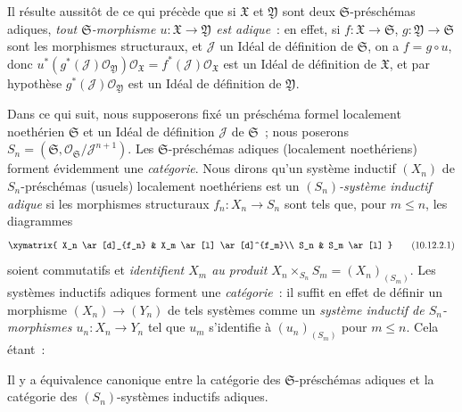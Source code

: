 Il résulte aussitôt de ce qui précède que si $\mathfrak{X}$ et
$\mathfrak{Y}$ sont deux $\mathfrak{S}$-préschémas adiques, \emph{tout
$\mathfrak{S}$-morphisme $u:\mathfrak{X}\to\mathfrak{Y}$ est adique}~:
en effet, si $f:\mathfrak{X}\to\mathfrak{S}$,
$g:\mathfrak{Y}\to\mathfrak{S}$ sont les morphismes structuraux, et
$\mathscr{J}$ un Idéal de définition de $\mathfrak{S}$, on a
$f=g\circ u$, donc
$u^*(g^*(\mathscr{J})\mathscr{O}_{\mathfrak{Y}})
\mathscr{O}_{\mathfrak{X}}=f^*(\mathscr{J})
\mathscr{O}_{\mathfrak{X}}$ est un Idéal de définition de
$\mathfrak{X}$, et par hypothèse
$g^*(\mathscr{J})\mathscr{O}_{\mathfrak{Y}}$ est un Idéal de définition
de $\mathfrak{Y}$.

\begin{env}[10.12.2]
\label{I.10.12.2-fr}
Dans ce qui suit, nous supposerons fixé un préschéma formel localement
noethérien $\mathfrak{S}$ et un Idéal de définition $\mathscr{J}$ de
$\mathfrak{S}$~; nous poserons
$S_n=(\mathfrak{S},\mathscr{O}_{\mathfrak{S}}/\mathscr{J}^{n+1})$. Les
$\mathfrak{S}$-préschémas adiques (localement noethériens) forment
évidemment une \emph{catégorie}. Nous dirons qu'un système inductif
$(X_n)$ de $S_n$-préschémas (usuels) localement noethériens est un
\emph{$(S_n)$-système inductif adique} si les morphismes structuraux
$f_n:X_n\to S_n$ sont tels que, pour $m\leq n$, les diagrammes
\[
  \label{I.10.12.2.1-fr}
  \xymatrix{
    X_n \ar[d]_{f_n}
    & X_m \ar[l] \ar[d]^{f_m}\\
    S_n
    & S_m \ar[l]
  }
  \tag{10.12.2.1}
\]
soient commutatifs et \emph{identifient $X_m$ au produit
$X_n\times_{S_n}S_m=(X_n)_{(S_m)}$}. Les systèmes inductifs adiques
forment une \emph{catégorie}~: il suffit en effet de définir un morphisme
$(X_n)\to(Y_n)$ de tels systèmes comme un \emph{système inductif de
$S_n$-morphismes $u_n:X_n\to Y_n$} tel que $u_m$ s'identifie à
$(u_n)_{(S_m)}$ pour $m\leq n$. Cela étant~:
\end{env}

\begin{theorem}[10.12.3]
\label{I.10.12.3-fr}
Il y a équivalence canonique entre la catégorie des
$\mathfrak{S}$-préschémas adiques et la catégorie des
$(S_n)$-systèmes inductifs adiques.
\end{theorem}

